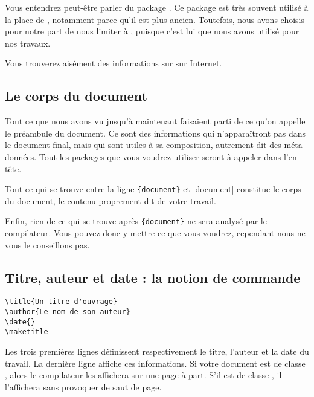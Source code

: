 \begin{anedocte}
Vous entendrez peut-être parler du package . Ce package est très souvent utilisé à la place de , notamment parce qu'il est plus ancien. Toutefois, nous avons choisis pour notre part de nous limiter à , puisque c'est lui que nous avons utilisé pour nos travaux.

Vous trouverez aisément des informations sur  sur Internet.

\end{anedocte}

\subsection{Le corps du document}

Tout ce que nous avons vu jusqu'à maintenant faisaient parti de ce qu'on appelle le préambule du document.\label{preambule} Ce sont des informations qui n'apparaîtront pas dans le document final, mais qui sont utiles à sa composition, autrement dit des méta-données. Tout les packages que vous voudrez utiliser seront à appeler dans l'en-tête.

Tout ce qui se trouve entre la ligne \verb|{document}| et |{document}| constitue le corps du document, le contenu proprement dit de votre travail.

Enfin, rien de ce qui se trouve après \verb|{document}| ne sera analysé par le compilateur. Vous pouvez donc y mettre ce que vous voudrez, cependant nous ne vous le conseillons pas.

\subsection{Titre, auteur et date : la notion de commande}\label{notioncommande}

\begin{verbatim}
\title{Un titre d'ouvrage}
\author{Le nom de son auteur}
\date{}
\maketitle
\end{verbatim}

Les trois premières lignes définissent respectivement le titre, l'auteur et la date du travail.  
La dernière ligne affiche ces informations. Si votre document est de classe  , alors le compilateur les affichera sur une page à part. S'il est de classe  , il l'affichera sans provoquer de saut de page.

